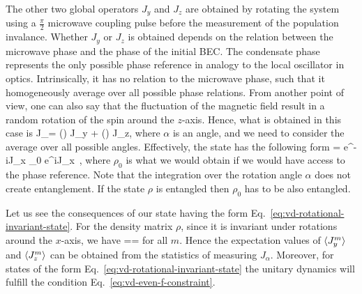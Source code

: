 The other two global operators $J_y$ and $J_z$ are obtained by rotating the system using a $\frac{\pi}{2}$ microwave coupling pulse before the measurement of the population invalance.
Whether $J_y$ or $J_z$ is obtained depends on the relation between the microwave phase and the phase of the initial BEC.
The condensate phase represents the only possible phase reference in analogy to the local oscillator in optics.
Intrinsically, it has no relation to the microwave phase, such that it homogeneously average over all possible phase relations.
From another point of view, one can also say that the fluctuation of the magnetic field result in a random rotation of the spin around the $z$-axis.
Hence, what is obtained in this case is
\be
  J_\alpha = \sin(\alpha) J_y + \cos(\alpha) J_z,
\ee
where $\alpha$ is an angle, and we need to consider the average over all possible angles.
Effectively, the state has the following form
\be
  \rho = \int e^{-i\alpha J_x} \rho_0 e^{i\alpha J_x}\, \alpha,
  \label{eq:vd-rotational-invariant-state}
\ee
where $\rho_0$ is what we would obtain if we would have access to the phase reference.
Note that the integration over the rotation angle $\alpha$ does not create entanglement.
If the state $\rho$ is entangled then $\rho_0$ has to be also entangled.

Let us see the consequences of our state having the form  Eq.~\eqref{eq:vd-rotational-invariant-state}.
For the density matrix $\rho$, since it is invariant under rotations around the $x$-axis, we have
\be
  ==
\ee
for all $m$.
Hence the expectation values of $\langle J_y^m \rangle$ and $\langle J_z^m \rangle$ can be obtained from the statistics of measuring $J_\alpha$.
Moreover, for states of the form Eq.~\eqref{eq:vd-rotational-invariant-state} the unitary dynamics will fulfill the condition Eq.~\eqref{eq:vd-even-f-constraint}.

